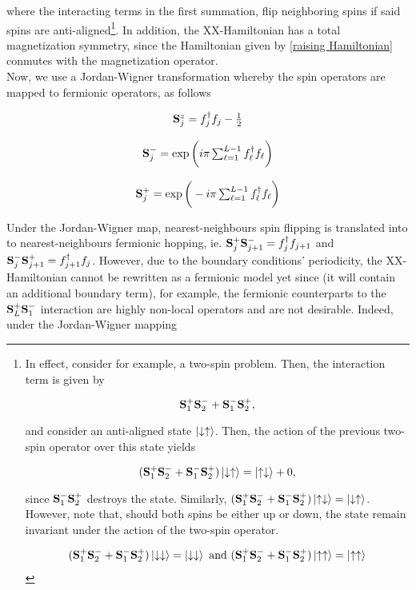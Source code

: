 \documentclass{homework}
\begin{document}
where the interacting terms in the first summation, flip neighboring spins if said spins are anti-aligned\footnote{In effect, consider for example, a two-spin problem. Then, the interaction term is given by 

$$
{\bf S}_1^+ {\bf S}_2^- + {\bf S}_1^- {\bf S}_2^+,
$$

and consider an anti-aligned state $\ket{\downarrow\uparrow}$. Then, the action of the previous two-spin operator over this state yields

$$
({\bf S}_1^+ {\bf S}_2^- + {\bf S}_1^- {\bf S}_2^+) \ket{\downarrow\uparrow} = \ket{\uparrow\downarrow} + 0,
$$

since ${\bf S}_1^- {\bf S}_2^+$ destroys the state. Similarly, $({\bf S}_1^+ {\bf S}_2^- + {\bf S}_1^- {\bf S}_2^+)\ket{\uparrow\downarrow} = \ket{\downarrow\uparrow}$. However, note that, should both spins be either up or down, the state remain invariant under the action of the two-spin operator. 

\begin{align}
    ({\bf S}_1^+ {\bf S}_2^- + {\bf S}_1^- {\bf S}_2^+) \ket{\downarrow\downarrow} = \ket{\downarrow\downarrow} \textnormal{ and } ({\bf S}_1^+ {\bf S}_2^- + {\bf S}_1^- {\bf S}_2^+) \ket{\uparrow\uparrow} = \ket{\uparrow\uparrow} 
\end{align}}. In addition, the XX-Hamiltonian has a total magnetization symmetry, since the Hamiltonian given by \eqref{raising Hamiltonian} conmutes with the magnetization operator. \\

Now, we use a Jordan-Wigner transformation whereby the spin operators are mapped to fermionic operators, as follows 

\begin{equation}
    \begin{array}{c}
         {\bf S}_j^z = f_j^\dagger f_j - \frac{1}{2}  \\
         \\
         {\bf S}_j^- = \exp\bigg(i\pi \sum_{\ell = 1}^{L-1} f_\ell^\dagger f_\ell \bigg) \\
         \\
         {\bf S}_j^+ = \exp\bigg(-i\pi \sum_{\ell = 1}^{L-1} f_\ell^\dagger f_\ell \bigg) 
    \end{array}
    \label{JW tr}
\end{equation}

Under the Jordan-Wigner map, nearest-neighbours spin flipping is translated into to nearest-neighbours fermionic hopping, ie. ${\bf S}_{j}^{+} {\bf S}_{j+1}^{-} = f_{j}^{\dagger} f_{j+1}$ and ${\bf S}_{j}^{-} {\bf S}_{j+1}^{+} = f_{j+1}^{\dagger} f_{j}$. However, due to the boundary conditions' periodicity, the XX-Hamiltonian cannot be rewritten as a fermionic model yet since (it will contain an additional boundary term), for example, the fermionic counterparts to the ${\bf S}_{L}^{+} {\bf S}_{1}^{-}$ interaction are highly non-local operators and are not desirable. Indeed, under the Jordan-Wigner mapping 
\end{document}

